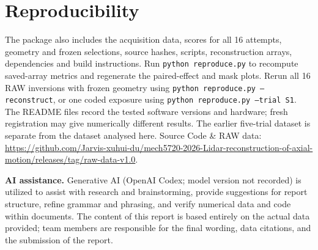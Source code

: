 \section{Reproducibility}
The package also includes the acquisition data, scores for all 16 attempts, geometry and frozen selections, source hashes, scripts, reconstruction arrays, dependencies and build instructions. Run \texttt{python reproduce.py} to recompute saved-array metrics and regenerate the paired-effect and mask plots. Rerun all 16 RAW inversions with frozen geometry using \texttt{python reproduce.py --reconstruct}, or one coded exposure using \texttt{python reproduce.py --trial S1}. The README files record the tested software versions and hardware; fresh registration may give numerically different results. The earlier five-trial dataset is separate from the dataset analysed here. Source Code \& RAW data: \url{https://github.com/Jarvis-xuhui-du/mech5720-2026-Lidar-reconstruction-of-axial-motion/releases/tag/raw-data-v1.0}.


\noindent\textbf{AI assistance.}
Generative AI (OpenAI Codex; model version not recorded) is utilized to assist with research and brainstorming, provide suggestions for report structure, refine grammar and phrasing, and verify numerical data and code within documents. The content of this report is based entirely on the actual data provided; team members are responsible for the final wording, data citations, and the submission of the report.